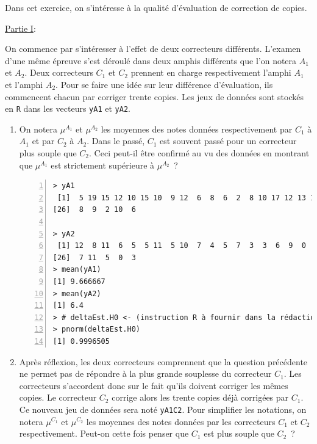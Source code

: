 \documentclass[10pt]{report}
\begin{document}
\begin{exercice}

Dans cet exercice, on s'intéresse à la qualité d'évaluation de correction de copies.

\noindent \underline{Partie I}:

On commence par s'intéresser à l'effet de deux correcteurs différents. L'examen d'une même épreuve s'est déroulé dans deux amphis différents que l'on notera $A_1$ et $A_2$. Deux correcteurs $C_1$ et $C_2$ prennent en charge respectivement l'amphi $A_1$ et l'amphi $A_2$. Pour se faire une idée sur leur différence d'évaluation, ils commencent chacun par corriger trente copies. Les jeux de données sont stockés en \texttt{R} dans les vecteurs \texttt{yA1} et \texttt{yA2}. 

\begin{enumerate}
\item On notera $\mu^{A_1}$ et $\mu^{A_2}$ les moyennes des notes données respectivement par $C_1$ à $A_1$ et par $C_2$ à $A_2$. Dans le passé, $C_1$ est souvent passé pour un correcteur plus souple que $C_2$. Ceci peut-il être confirmé au vu des données en montrant que $\mu^{A_1}$ est strictement supérieure à $\mu^{A_2}$~?


 
\IndicR
\begin{Verbatim}[frame=leftline,fontfamily=tt,fontshape=n,numbers=left]
> yA1
 [1]  5 19 15 12 10 15 10  9 12  6  8  6  2  8 10 17 12 13 11  6  9  9 11 12  8
[26]  8  9  2 10  6

> yA2
 [1] 12  8 11  6  5  5 11  5 10  7  4  5  7  3  3  6  9  0  6  0 10  6 14  5  8
[26]  7 11  5  0  3
> mean(yA1)
[1] 9.666667
> mean(yA2)
[1] 6.4
> # deltaEst.H0 <- (instruction R à fournir dans la rédaction)
> pnorm(deltaEst.H0)
[1] 0.9996505
\end{Verbatim}

 





\item Après réflexion, les deux correcteurs comprennent que la question précédente ne permet pas de répondre à la plus grande souplesse du correcteur $C_1$. Les correcteurs s'accordent donc sur le fait qu'ils doivent corriger les mêmes copies. Le correcteur $C_2$ corrige alors les trente copies déjà corrigées par $C_1$. Ce nouveau jeu de données sera noté \texttt{yA1C2}. Pour simplifier les notations, on notera $\mu^{C_1}$ et $\mu^{C_2}$ les moyennes des notes données par les correcteurs $C_1$ et $C_2$ respectivement. Peut-on cette fois penser que $C_1$ est plus souple que $C_2$~?


\end{enumerate}
\end{exercice}
\end{document}
